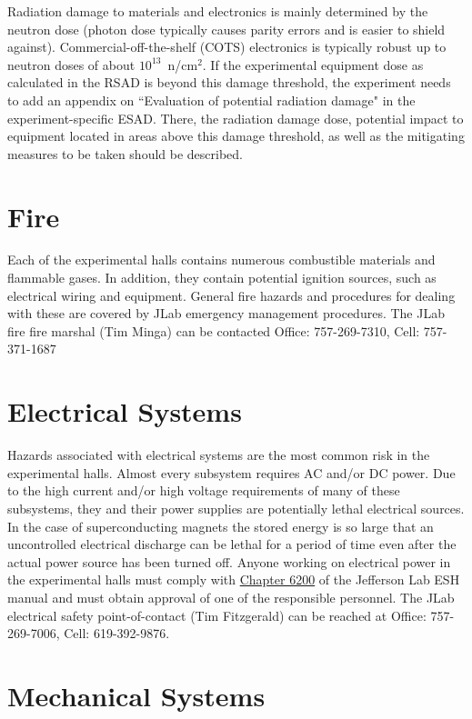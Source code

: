 \documentclass[11pt]{report}
\begin{document}
Radiation damage to materials and electronics is mainly determined by the neutron 
dose (photon dose typically causes parity errors and is easier to shield against). 
Commercial-off-the-shelf (COTS) electronics is typically robust up to neutron doses of 
about $10^{13}$~n/cm$^2$. If the experimental equipment dose as calculated in the RSAD 
is beyond this damage threshold, the experiment needs to add an appendix on ``Evaluation 
of potential radiation damage" in the experiment-specific ESAD. There, the radiation 
damage dose, potential impact to equipment located in areas above this damage threshold, 
as well as the mitigating measures to be taken should be described.

\section{Fire}

Each of the experimental halls contains numerous combustible materials and flammable gases. 
In addition, they contain potential ignition sources, such as electrical wiring and equipment. 
General fire hazards and procedures for dealing with these are covered by JLab emergency 
management procedures. The JLab fire fire marshal (Tim Minga) can be contacted Office: 757-269-7310, Cell: 757-371-1687 

\section{Electrical Systems}

Hazards associated with electrical systems are the most common risk in the experimental 
halls. Almost every subsystem requires AC and/or DC power. Due to the high current and/or 
high voltage requirements of many of these subsystems, they and their power supplies are 
potentially lethal electrical sources. In the case of superconducting magnets the stored 
energy is so large that an uncontrolled electrical discharge can be lethal for a period of 
time even after the actual power source has been turned off. Anyone working on electrical 
power in the experimental halls must comply with 
\href{http://www.jlab.org/ESH/ESHmanual/manual/6200.html}{Chapter 6200} of the Jefferson Lab 
ESH manual and must obtain approval of one of the responsible personnel. The JLab 
electrical safety point-of-contact (Tim Fitzgerald) can be reached at Office: 757-269-7006, Cell: 619-392-9876.

\section{Mechanical Systems}
\end{document}

